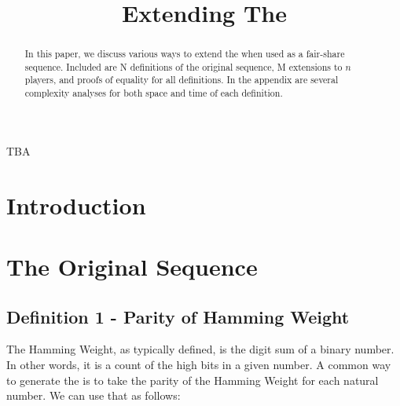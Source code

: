 \documentclass[conference]{IEEEtran}
\begin{document}
\title{Extending The \TMS}

\author{
\and
{}
}

\maketitle

\begin{abstract}
In this paper, we discuss various ways to extend the \TMS \cite{OEIS-TMS} when used as a fair-share sequence. Included are N definitions of the original sequence, M extensions to $n$ players, and proofs of equality for all definitions. In the appendix are several complexity analyses for both space and time of each definition.
\end{abstract}

\begin{IEEEkeywords}
TBA
\end{IEEEkeywords}

\section{Introduction}

\section{The Original Sequence}

\subsection{Definition 1 - Parity of Hamming Weight}


The Hamming Weight, as typically defined, is the digit sum of a binary number. In other words, it is a count of the high bits in a given number. A common way to generate the \TMS is to take the parity of the Hamming Weight for each natural number. We can use that as follows:
\end{document}
